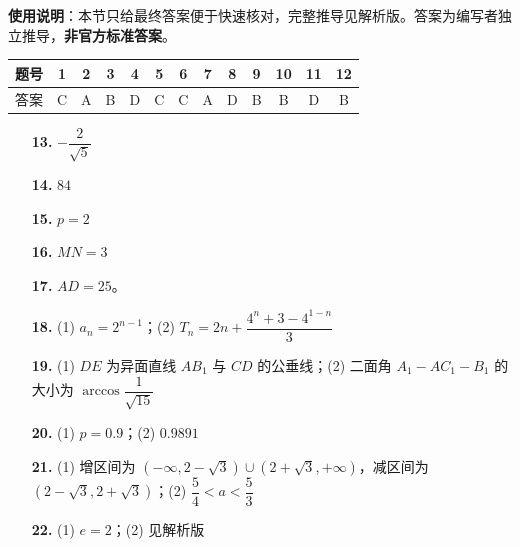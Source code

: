 
\begin{gknotice}
\textbf{使用说明}：本节只给最终答案便于快速核对，完整推导见解析版。答案为编写者独立推导，\textbf{非官方标准答案}。
\end{gknotice}

\begin{center}\begin{tabular}{ccccccccccccc}
\toprule
题号 & 1 & 2 & 3 & 4 & 5 & 6 & 7 & 8 & 9 & 10 & 11 & 12 \\
\midrule
答案 & C & A & B & D & C & C & A & D & B & B & D & B \\
\bottomrule
\end{tabular}\end{center}

\begin{itemize}[leftmargin=2.6em]
  \item[\textbf{13.}] $-\dfrac{2}{\sqrt5}$
  \item[\textbf{14.}] $84$
  \item[\textbf{15.}] $p=2$
  \item[\textbf{16.}] $MN=3$
\end{itemize}

\begin{itemize}[leftmargin=2.6em]
  \item[\textbf{17.}] $AD=25$。
  \item[\textbf{18.}] (1) $a_n=2^{n-1}$；(2) $T_n=2n+\dfrac{4^n+3-4^{1-n}}3$
  \item[\textbf{19.}] (1) $DE$ 为异面直线 $AB_1$ 与 $CD$ 的公垂线；(2) 二面角 $A_1-AC_1-B_1$ 的大小为 $\arccos\dfrac1{\sqrt{15}}$
  \item[\textbf{20.}] (1) $p=0.9$；(2) $0.9891$
  \item[\textbf{21.}] (1) 增区间为 $(-\infty,2-\sqrt3)\cup(2+\sqrt3,+\infty)$，减区间为 $(2-\sqrt3,2+\sqrt3)$；(2) $\dfrac54<a<\dfrac53$
  \item[\textbf{22.}] (1) $e=2$；(2) 见解析版
\end{itemize}
